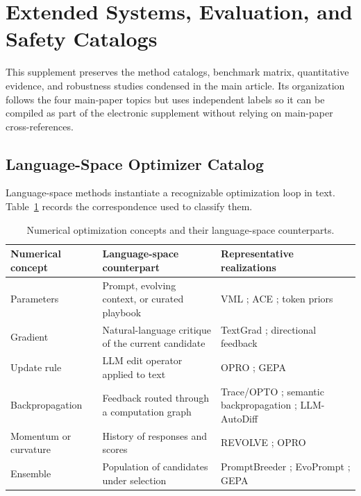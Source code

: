 \section{Extended Systems, Evaluation, and Safety Catalogs}
\label{supp:extended-systems-evaluation-safety}

This supplement preserves the method catalogs, benchmark matrix, quantitative evidence, and robustness studies condensed in the main article. Its organization follows the four main-paper topics but uses independent labels so it can be compiled as part of the electronic supplement without relying on main-paper cross-references.

\subsection{Language-Space Optimizer Catalog}
\label{supp:language-space-optimizers}

Language-space methods instantiate a recognizable optimization loop in text. Table~\ref{supp:tab-langopt-analogy} records the correspondence used to classify them.

\begin{table}[t]
\centering
\small
\caption{Numerical optimization concepts and their language-space counterparts.}
\label{supp:tab-langopt-analogy}
\begin{tabular}{@{}p{}p{}p{}@{}}
\toprule
\textbf{Numerical concept} & \textbf{Language-space counterpart} & \textbf{Representative realizations} \\
\midrule
Parameters & Prompt, evolving context, or curated playbook & VML \citep{xiao2024verbalized}; ACE \citep{zhang2025agentic}; token priors \citep{cai2025trainingfree} \\
Gradient & Natural-language critique of the current candidate & TextGrad \citep{yuksekgonul2024textgrad}; directional feedback \citep{nie2024importance} \\
Update rule & LLM edit operator applied to text & OPRO \citep{yang2024opro}; GEPA \citep{agrawal2026gepa} \\
Backpropagation & Feedback routed through a computation graph & Trace/OPTO \citep{cheng2024trace}; semantic backpropagation \citep{wang2024how}; LLM-AutoDiff \citep{yin2025llmautodiff} \\
Momentum or curvature & History of responses and scores & REVOLVE \citep{zhang2024revolve}; OPRO \citep{yang2024opro} \\
Ensemble & Population of candidates under selection & PromptBreeder \citep{fernando2023promptbreeder}; EvoPrompt \citep{guo2024evoprompt}; GEPA \citep{agrawal2026gepa} \\
\bottomrule
\end{tabular}
\end{table}


